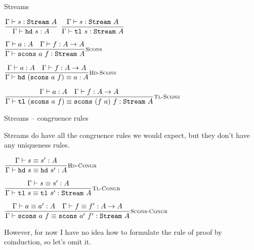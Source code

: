 \documentclass{beamer}
\begin{document}
\newcommand{\AxiStream}[1]{\texttt{Stream}\ #1}
\newcommand{\hd}[1][]{\texttt{hd}\ #1}
\newcommand{\tl}[1][]{\texttt{tl}\ #1}
\newcommand{\streamintro}[2]{\texttt{scons}\ #1\ #2}

\begin{frame}{Streams}

\begin{center}

  $\infrule{\typing{s}{\AxiStream{A}}}{\typing{\hd[s]}{A}}$ \quad
  $\infrule{\typing{s}{\AxiStream{A}}}{\typing{\tl[s]}{\AxiStream{A}}}$

  \vspace{2em}

  $\infrule[Scons]{\typing{a}{A} \quad \typing{f}{\Fun{A}{A}}}{\typing{\streamintro{a}{f}}{\AxiStream{A}}}$

  \vspace{2em}

  $\infrule[Hd-Scons]{\typing{a}{A} \quad \typing{f}{\Fun{A}{A}}}{\compeq{\hd[(\streamintro{a}{f})]}{a}{A}}$

  \vspace{2em}

  $\infrule[Tl-Scons]{\typing{a}{A} \quad \typing{f}{\Fun{A}{A}}}{\compeq{\tl[(\streamintro{a}{f})]}{\streamintro{(\app{f}{a})}{f}}{\AxiStream{A}}}$
\end{center}

\end{frame}

\begin{frame}{Streams -- congruence rules}

Streams do have all the congruence rules we would expect, but they don't have any uniqueness rules.

\vspace{1em}

\begin{center}
  $\infrule[Hd-Congr]{\compeq{s}{s'}{A}}{\compeq{\hd[s]}{\hd[s']}{A}}$

  \vspace{2em}

  $\infrule[Tl-Congr]{\compeq{s}{s'}{A}}{\compeq{\tl[s]}{\tl[s']}{\AxiStream{A}}}$

  \vspace{2em}

  $\infrule[Scons-Congr]{\compeq{a}{a'}{A} \quad \compeq{f}{f'}{\Fun{A}{A}}}{\compeq{\streamintro{a}{f}}{\streamintro{a'}{f'}}{\AxiStream{A}}}$
\end{center}

\vspace{1em}

However, for now I have no idea how to formulate the rule of proof by coinduction, so let's omit it.

\end{frame}
\end{document}
